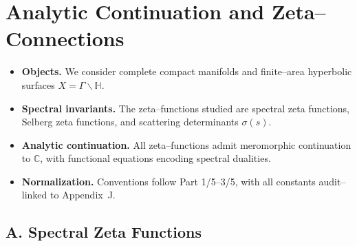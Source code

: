

\section{Analytic Continuation and Zeta–Connections}
\label{sec:analytic-zeta}

\begin{tcolorbox}[colback=gray!5,colframe=gray!35,title=Scope \& Assumptions (MEA-Core-SS • enforced)]
\begin{itemize}
  \item \textbf{Objects.} We consider complete compact manifolds and finite–area hyperbolic surfaces $X=\Gamma\backslash\mathbb H$.
  \item \textbf{Spectral invariants.} The zeta–functions studied are spectral zeta functions, Selberg zeta functions, and scattering determinants $\sigma(s)$.
  \item \textbf{Analytic continuation.} All zeta–functions admit meromorphic continuation to $\mathbb C$, with functional equations encoding spectral dualities.
  \item \textbf{Normalization.} Conventions follow Part 1/5–3/5, with all constants audit–linked to Appendix~J.
\end{itemize}
\end{tcolorbox}

\subsection*{A. Spectral Zeta Functions}
\label{subsec:spectral-zeta}

